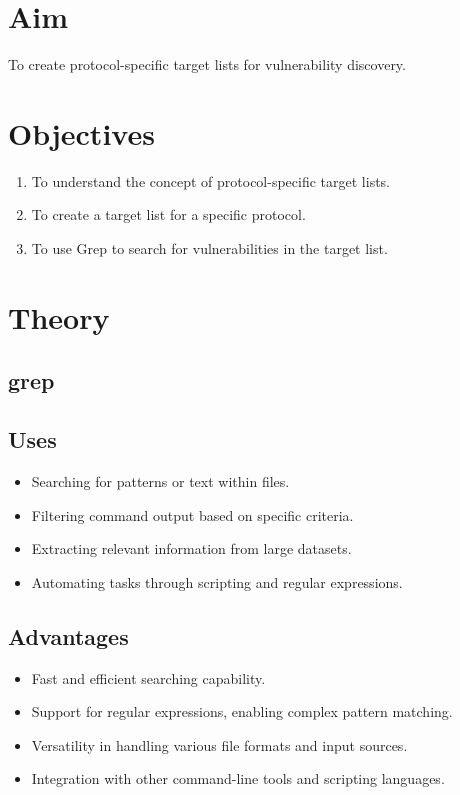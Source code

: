 \documentclass[11pt]{article}
\begin{document}
\tableofcontents
\thispagestyle{empty}
\clearpage

\setcounter{page}{1}

\section{Aim}
To create protocol-specific target lists for vulnerability discovery.
\section{Objectives}
\begin{enumerate}
    \item To understand the concept of protocol-specific target lists.
    \item To create a target list for a specific protocol.
    \item To use Grep to search for vulnerabilities in the target list.
\end{enumerate}

\section{Theory}
\subsection{grep}

\subsection{Uses}
\begin{itemize}
    \item Searching for patterns or text within files.
    \item Filtering command output based on specific criteria.
    \item Extracting relevant information from large datasets.
    \item Automating tasks through scripting and regular expressions.
\end{itemize}

\subsection{Advantages}
\begin{itemize}
    \item Fast and efficient searching capability.
    \item Support for regular expressions, enabling complex pattern matching.
    \item Versatility in handling various file formats and input sources.
    \item Integration with other command-line tools and scripting languages.
\end{itemize}
\end{document}
